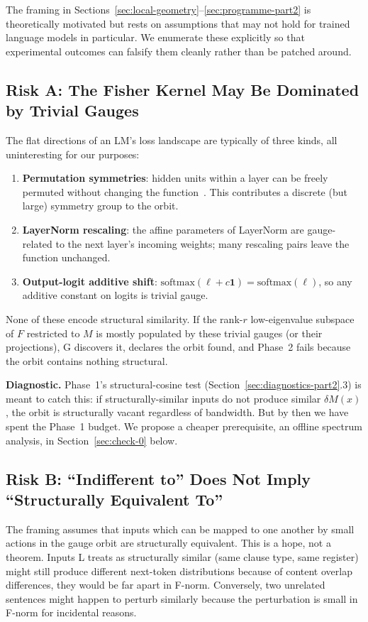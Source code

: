 \documentclass[11pt, a4paper]{article}
\theoremstyle{plain}
\theoremstyle{definition}
\theoremstyle{remark}
\begin{document}
The framing in Sections~\ref{sec:local-geometry}--\ref{sec:programme-part2} is theoretically motivated but rests on assumptions that may not hold for trained language models in particular.
We enumerate these explicitly so that experimental outcomes can falsify them cleanly rather than be patched around.

\subsection{Risk A: The Fisher Kernel May Be Dominated by Trivial Gauges}

The flat directions of an LM's loss landscape are typically of three kinds, all uninteresting for our purposes:
\begin{enumerate}[nosep]
\item \textbf{Permutation symmetries}: hidden units within a layer can be freely permuted without changing the function~\cite{ainsworth2023git}. This contributes a discrete (but large) symmetry group to the orbit.
\item \textbf{LayerNorm rescaling}: the affine parameters of LayerNorm are gauge-related to the next layer's incoming weights; many rescaling pairs leave the function unchanged.
\item \textbf{Output-logit additive shift}: $\mathrm{softmax}(\ell + c\mathbf{1}) = \mathrm{softmax}(\ell)$, so any additive constant on logits is trivial gauge.
\end{enumerate}
None of these encode structural similarity.
If the rank-$r$ low-eigenvalue subspace of $F$ restricted to $M$ is mostly populated by these trivial gauges (or their projections), G discovers it, declares the orbit found, and Phase~2 fails because the orbit contains nothing structural.

\textbf{Diagnostic.} Phase~1's structural-cosine test (Section~\ref{sec:diagnostics-part2}.3) is meant to catch this: if structurally-similar inputs do not produce similar $\delta M(x)$, the orbit is structurally vacant regardless of bandwidth.
But by then we have spent the Phase~1 budget.
We propose a cheaper prerequisite, an offline spectrum analysis, in Section~\ref{sec:check-0} below.

\subsection{Risk B: ``Indifferent to'' Does Not Imply ``Structurally Equivalent To''}

The framing assumes that inputs which can be mapped to one another by small actions in the gauge orbit are structurally equivalent.
This is a hope, not a theorem.
Inputs L treats as structurally similar (same clause type, same register) might still produce different next-token distributions because of content overlap differences, they would be far apart in F-norm.
Conversely, two unrelated sentences might happen to perturb similarly because the perturbation is small in F-norm for incidental reasons.
\end{document}
